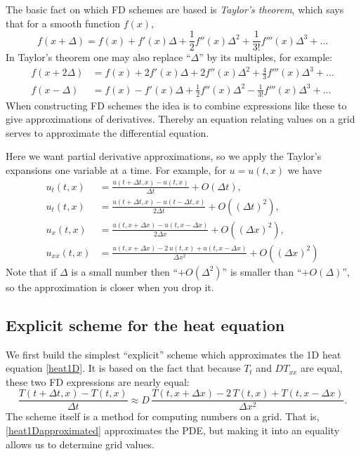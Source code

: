 \documentclass[letterpaper,final,12pt,reqno]{amsart}
\begin{document}
The basic fact on which FD schemes are based is \emph{Taylor's theorem}, which says that for a smooth function $f(x)$,
	$$f(x+\Delta) = f(x) + f'(x) \Delta + \frac{1}{2} f''(x) \Delta^2 + \frac{1}{3!} f'''(x) \Delta^3 + \dots$$
In Taylor's theorem one may also replace ``$\Delta$'' by its multiples, for example:
\begin{align*}
f(x+2\Delta) &= f(x) + 2 f'(x) \Delta + 2 f''(x) \Delta^2 + \frac{4}{3} f'''(x) \Delta^3 + \dots \\
f(x-\Delta) &= f(x) - f'(x) \Delta + \frac{1}{2} f''(x) \Delta^2 - \frac{1}{3!} f'''(x) \Delta^3 + \dots
\end{align*}
When constructing FD schemes the idea is to combine expressions like these to give approximations of derivatives.  Thereby an equation relating values on a grid serves to approximate the differential equation.

Here we want partial derivative approximations, so we apply the Taylor's expansions one variable at a time.  For example, for $u=u(t,x)$ we have
\begin{align*}
u_t(t,x) &= \frac{u(t+\Delta t,x) - u(t,x)}{\Delta t} + O(\Delta t), \\
u_t(t,x) &= \frac{u(t+\Delta t,x) - u(t-\Delta t,x)}{2\Delta t} + O((\Delta t)^2), \\
u_x(t,x) &= \frac{u(t,x+\Delta x) - u(t,x-\Delta x)}{2\Delta x} + O((\Delta x)^2), \\
u_{xx}(t,x) &= \frac{u(t,x+\Delta x) - 2\, u(t,x) + u(t,x-\Delta x)}{\Delta x^2} + O((\Delta x)^2)
\end{align*}
Note that if $\Delta$ is a small number then ``$+O(\Delta^2)$'' is smaller than ``$+O(\Delta)$'', so the approximation is closer when you drop it.

\subsection*{Explicit scheme for the heat equation}  We first build the simplest ``explicit'' scheme which approximates the 1D heat equation \eqref{heat1D}.  It is based on the fact that because $T_t$ and $D T_{xx}$ are equal, these two FD expressions are nearly equal:
\begin{equation}
\frac{T(t+\Delta t,x) - T(t,x)}{\Delta t} \approx D\,\frac{T(t,x+\Delta x) - 2\, T(t,x) + T(t,x-\Delta x)}{\Delta x^2}.  \label{heat1Dapproximated}
\end{equation}
The scheme itself is a method for computing numbers on a grid.  That is, \eqref{heat1Dapproximated} approximates the PDE, but making it into an equality allows us to determine grid values.
\end{document}
